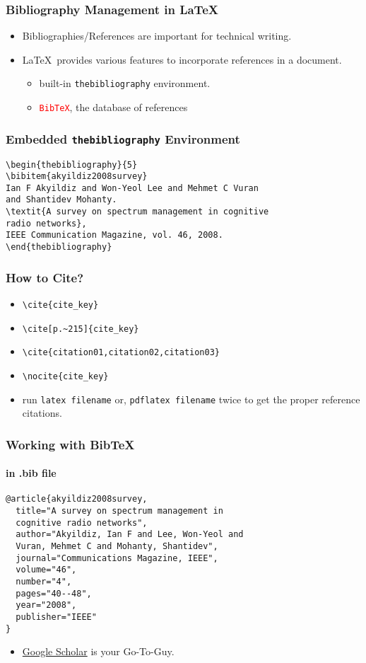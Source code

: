 \documentclass{beamer}
\begin{document}
\begin{frame}
\frametitle{Bibliography Management in \LaTeX}
\begin{itemize}
    \item Bibliographies/References are important for technical writing.
    \item \LaTeX\ provides various features to incorporate references in a document.
    \begin{itemize}
        \item built-in \textcolor{green!50!black}{\texttt{thebibliography}} environment.
        \item \textcolor{red}{\texttt{BibTeX}}, the database of references
    \end{itemize}
\end{itemize}
\end{frame}
\begin{frame}[]
\frametitle{Embedded \textcolor{green!50!black}{\texttt{thebibliography}} Environment}
\begin{lstlisting}
\begin{thebibliography}{5}
\bibitem{akyildiz2008survey}
Ian F Akyildiz and Won-Yeol Lee and Mehmet C Vuran
and Shantidev Mohanty.
\textit{A survey on spectrum management in cognitive
radio networks},
IEEE Communication Magazine, vol. 46, 2008.
\end{thebibliography}
\end{lstlisting}
\end{frame}
\begin{frame}[fragile]
\frametitle{How to Cite?}
\begin{itemize}
    \item \verb|\cite{cite_key}|
    \item \verb|\cite[p.~215]{cite_key}|
    \item \verb|\cite{citation01,citation02,citation03}|
    \item \verb|\nocite{cite_key}|
    \item run \texttt{latex filename} or, \texttt{pdflatex filename} twice to get the proper reference citations.
\end{itemize}
\end{frame}
\begin{frame}[fragile]
\frametitle{Working with BibTeX}
\framesubtitle{in .bib file}
\begin{lstlisting}
@article{akyildiz2008survey,
  title="A survey on spectrum management in
  cognitive radio networks",
  author="Akyildiz, Ian F and Lee, Won-Yeol and
  Vuran, Mehmet C and Mohanty, Shantidev",
  journal="Communications Magazine, IEEE",
  volume="46",
  number="4",
  pages="40--48",
  year="2008",
  publisher="IEEE"
}
\end{lstlisting}
\pause
\begin{itemize}
    \item \href{http://scholar.google.com}{Google Scholar} is your Go-To-Guy.
\end{itemize}
\end{frame}
\end{document}

